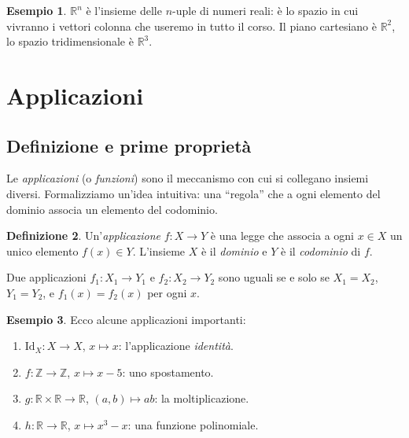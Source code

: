 \documentclass[11pt, a4paper]{book}
\theoremstyle{definition}
\newtheorem{definizione}{Definizione}[section]
\newtheorem{esempio}[definizione]{Esempio}
\theoremstyle{plain}
\theoremstyle{remark}
\newcommand{\Z}{\mathbb{Z}}
\newcommand{\R}{\mathbb{R}}
\newcommand{\Id}{\mathrm{Id}}
\begin{document}
\begin{exbox}
\begin{esempio}
$\R^n$ è l'insieme delle $n$-uple di numeri reali: è lo spazio in cui vivranno i vettori colonna che useremo in tutto il corso. Il piano cartesiano è $\R^2$, lo spazio tridimensionale è $\R^3$.
\end{esempio}
\end{exbox}

\section{Applicazioni}

\subsection{Definizione e prime proprietà}

Le \emph{applicazioni} (o \emph{funzioni}) sono il meccanismo con cui si collegano insiemi diversi. Formalizziamo un'idea intuitiva: una ``regola'' che a ogni elemento del dominio associa un elemento del codominio.

\begin{defbox}
\begin{definizione}
Un'\emph{applicazione} $f \colon X \to Y$ è una legge che associa a ogni $x \in X$ un unico elemento $f(x) \in Y$. L'insieme $X$ è il \emph{dominio} e $Y$ è il \emph{codominio} di $f$.

Due applicazioni $f_1 \colon X_1 \to Y_1$ e $f_2 \colon X_2 \to Y_2$ sono uguali se e solo se $X_1 = X_2$, $Y_1 = Y_2$, e $f_1(x) = f_2(x)$ per ogni $x$.
\end{definizione}
\end{defbox}

\begin{exbox}
\begin{esempio}
Ecco alcune applicazioni importanti:
\begin{enumerate}
  \item $\Id_X \colon X \to X$, $x \mapsto x$: l'applicazione \emph{identità}.
  \item $f \colon \Z \to \Z$, $x \mapsto x - 5$: uno spostamento.
  \item $g \colon \R \times \R \to \R$, $(a,b) \mapsto ab$: la moltiplicazione.
  \item $h \colon \R \to \R$, $x \mapsto x^3 - x$: una funzione polinomiale.
\end{enumerate}
\end{esempio}
\end{exbox}
\end{document}
